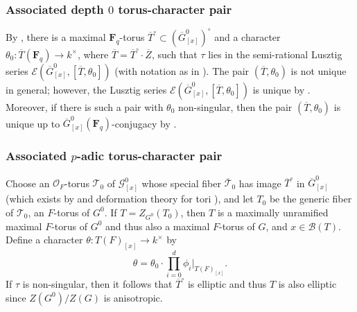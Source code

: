 \documentclass[reqno]{amsart}
\numberwithin{equation}{subsection}
\newcommand{\F}{\mathbf{F}}
\newcommand{\wt}[1]{\widetilde{#1}}
\newcommand{\Q}{\mathbf{Q}}
\newcommand{\Z}{\mathbf{Z}}
\newcommand{\ol}[1]{\overline{#1}}
\newcommand{\co}{\colon}
\newcommand\cB{\mathcal{B}}
\newcommand\cE{\mathcal{E}}
\newcommand\cG{\mathcal{G}}
\newcommand\cO{\mathcal{O}}
\newcommand\cT{\mathcal{T}}
\theoremstyle{remark}
\numberwithin{equation}{subsection}
\numberwithin{figure}{subsection}
\begin{document}
\subsubsection{Associated depth $0$ torus-character pair}
By \cite[Proposition~2.6.2]{Cot26b}, there is a maximal $\F_q$-torus $\ol T^\circ \subset (\ol G^0_{[x]})^\circ$ and a character $\theta_0\co \ol T(\F_q) \to k^\times$, where $\ol T = \ol T^\circ \cdot \ol Z$, such that $\tau$ lies in the semi-rational Lusztig series $\cE(\ol G^0_{[x]}, [\ol T, \theta_0])$ (with notation as in \cite[Definition~2.8.2]{Cot26b}). %
The pair $(\ol T, \theta_0)$ is not unique in general; however, the Lusztig series $\cE(\ol G^0_{[x]}, [\ol T, \theta_0])$ is unique by \cite[Lemma~2.8.4]{Cot26b}. Moreover, if there is such a pair with $\theta_0$ non-singular, then the pair $(\ol T, \theta_0)$ is unique up to $\ol G^0_{[x]}(\F_q)$-conjugacy by \cite[Lemma~2.9.2]{Cot26b}.


\subsubsection{Associated $p$-adic torus-character pair}\label{sss:p-adic-torus-character-pair}
Choose an $\cO_F$-torus $\cT_0$ of $\cG^0_{[x]}$ whose special fiber $\ol\cT_0$ has image $\ol T^\circ$ in $\ol G^0_{[x]}$ (which exists by \cite[Proposition 11.14(1)]{Bor91} and deformation theory for tori \cite[Expos\'e IX, Th\'eor\`eme 3.6, Th\'eor\`eme 7.1]{SGA3II}), and let $T_0$ be the generic fiber of $\cT_0$, an $F$-torus of $G^0$. If $T = Z_{G^0}(T_0)$, then $T$ is a maximally unramified maximal $F$-torus of $G^0$ and thus also a maximal $F$-torus of $G$, and $x \in \cB(T)$. Define a character $\theta\co T(F)_{[x]} \to k^\times$ by
\[
\theta = \theta_0 \cdot \prod_{i=0}^d \phi_i|_{T(F)_{[x]}}.
\]
If $\tau$ is non-singular, then it follows that $\ol T^\circ$ is elliptic and thus $T$ is also elliptic since $Z(G^0)/Z(G)$ is anisotropic.
\end{document}
